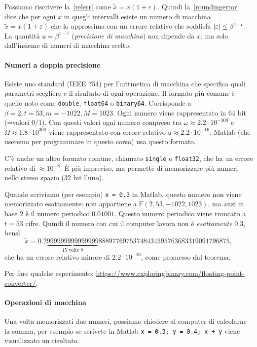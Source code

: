 \documentclass[a4paper]{report}
\DeclarePairedDelimiter{\abs}{\lvert}{\rvert}
\theoremstyle{definiton}
\theoremstyle{remark}
\begin{document}
Possiamo riscrivere la~\eqref{relerr} come $\tilde{x} = x(1+\varepsilon)$. Quindi la~\eqref{roundingerror} dice che per ogni $x$ in quegli intervalli esiste un numero di macchina $\tilde{x} = x(1+\varepsilon)$ che lo approssima con un errore relativo che soddisfa $\abs{\varepsilon} \leq \beta^{1-t}$. La quantità $\mathsf{u} = \beta^{1-t}$ (\emph{precisione di macchina}) non dipende da $x$, ma solo dall'insieme di numeri di macchina scelto.


\paragraph{Numeri a doppia precisione}
Esiste uno standard (IEEE 754) per l'aritmetica di macchina che specifica quali parametri scegliere e il risultato di ogni operazione. Il formato più comune è quello noto come \texttt{double}, \texttt{float64} o \texttt{binary64}. Corrisponde a $\beta = 2, t=53, m=-1022, M = 1023$. Ogni numero viene rappresentato in 64 bit (=valori 0/1). Con questi valori ogni numero compreso tra $\omega \approx 2.2 \cdot 10^{-308}$ e $\Omega \approx 1.8 \cdot 10^{308}$ viene rappresentato con errore relativo $\mathsf{u} \approx 2.2 \cdot 10^{-16}$. Matlab (che useremo per programmare in questo corso) usa questo formato.

C'è anche un altro formato comune, chiamato \texttt{single} o \texttt{float32}, che ha un errore relativo di $\approx 10^{-8}$. È più impreciso, ma permette di memorizzare più numeri nello stesso spazio (32 bit l'uno).

Quando scriviamo (per esempio) \texttt{x = 0.3} in Matlab, questo numero non viene memorizzato esattamente: non appartiene a $\mathbb{F}(2, 53, -1022, 1023)$, ma anzi in base 2 è il numero periodico $0.0\overline{1001}$. Questo numero periodico viene troncato a $t=53$ cifre. Quindi il numero con cui il computer lavora non è \emph{esattamente} $0.3$, bensì
\[
\tilde{x} = 0.2\underbrace{999999999999999}_{\text{15 volte 9}}88897769753748434595763683319091796875,
\]
che ha un errore relativo minore di $2.2 \cdot 10^{-16}$, come promesso dal teorema.

Per fare qualche esperimento: \url{https://www.exploringbinary.com/floating-point-converter/}.

\paragraph{Operazioni di macchina}

Una volta memorizzati due numeri, possiamo chiedere al computer di calcolarne la somma, per esempio se scrivete in Matlab
\texttt{x = 0.3; y = 0.4; x + y} viene visualizzato un risultato.
\end{document}
